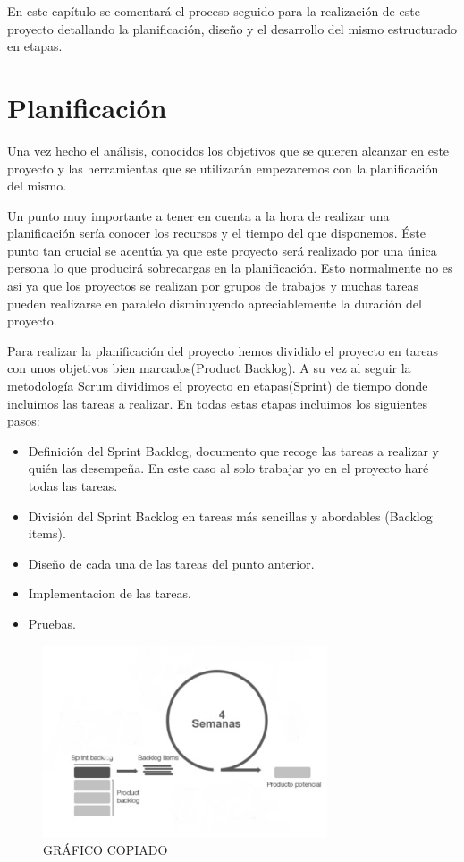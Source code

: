 

 En este capítulo se comentará el proceso seguido para la realización de este proyecto detallando la planificación, diseño y el desarrollo del mismo estructurado en etapas.
 
\section{Planificación}

Una vez hecho el análisis, conocidos los objetivos que se quieren alcanzar en este proyecto y las herramientas que se utilizarán  empezaremos con la planificación del mismo.

Un punto muy  importante a tener en cuenta a la hora de realizar una planificación sería conocer los recursos y el tiempo del que disponemos.
Éste punto tan crucial se acentúa ya que este proyecto será realizado por una única persona lo que producirá sobrecargas en la planificación. Esto normalmente no es así ya que los proyectos se realizan por grupos de trabajos y muchas tareas pueden realizarse en paralelo disminuyendo apreciablemente la duración del proyecto.

Para realizar la planificación del proyecto hemos dividido el proyecto en tareas con unos objetivos bien marcados(Product Backlog). A su vez al seguir la metodología Scrum dividimos el proyecto en etapas(Sprint) de tiempo donde incluimos las tareas a realizar.
 En todas estas etapas incluimos los siguientes pasos:
 
 


\begin{itemize}
\item Definición del Sprint Backlog,  documento que recoge las tareas a realizar y quién las desempeña. En este caso al solo trabajar yo en el proyecto haré todas las tareas.


\item División del Sprint Backlog en tareas más sencillas y abordables (Backlog items). 



\item Diseño de cada una de las tareas del punto anterior.
\item  Implementacion de las tareas.
\item Pruebas.
\end{itemize}

\begin{figure}[H]
		\centering
		\includegraphics[width=0.75\textwidth] {backlog.png}
		\caption{GRÁFICO COPIADO}
	\end{figure} 

